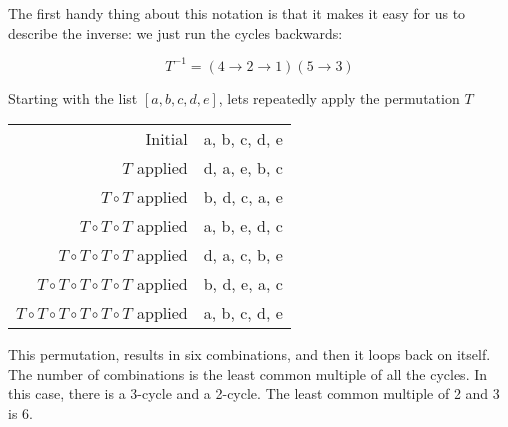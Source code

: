 The first handy thing about this notation is that it makes it easy for
us to describe the inverse: we just run the cycles backwards:

$$T^{-1} = (4 \rightarrow 2 \rightarrow 1)(5 \rightarrow 3)$$

Starting with the list $[a, b, c, d, e]$, lets repeatedly apply the permutation $T$

\begin{tabular}{r | l}
  Initial & {\color{red} a, b,} {\color{blue} c,} {\color{red} d,} {\color{blue} e} \\ 
  $T$ applied & {\color{red} d, a,}  {\color{blue} e,} {\color{red} b,} {\color{blue} c}\\
  $T \circ T$ applied & {\color{red} b, d,} {\color{blue} c,} {\color{red} a,}  {\color{blue} e} \\
  $T \circ T \circ T$ applied & {\color{red} a, b,}  {\color{blue} e,} {\color{red} d,} {\color{blue} c} \\
  $T \circ T \circ T \circ T$ applied & {\color{red} d, a,} {\color{blue} c,} {\color{red}b,}  {\color{blue} e} \\
  $T \circ T \circ T \circ T \circ T$ applied & {\color{red} b, d,}  {\color{blue} e,} {\color{red} a,} {\color{blue} c} \\
  $T \circ T \circ T \circ T \circ T \circ T$ applied & {\color{red} a, b,} {\color{blue} c,} {\color{red} d,}  {\color{blue} e}\\
\end{tabular}

This permutation, results in six combinations, and then it loops back
on itself. The number of combinations is the least common multiple of
all the cycles.  In this case, there is a 3-cycle and a 2-cycle. The
least common multiple of 2 and 3 is 6.

